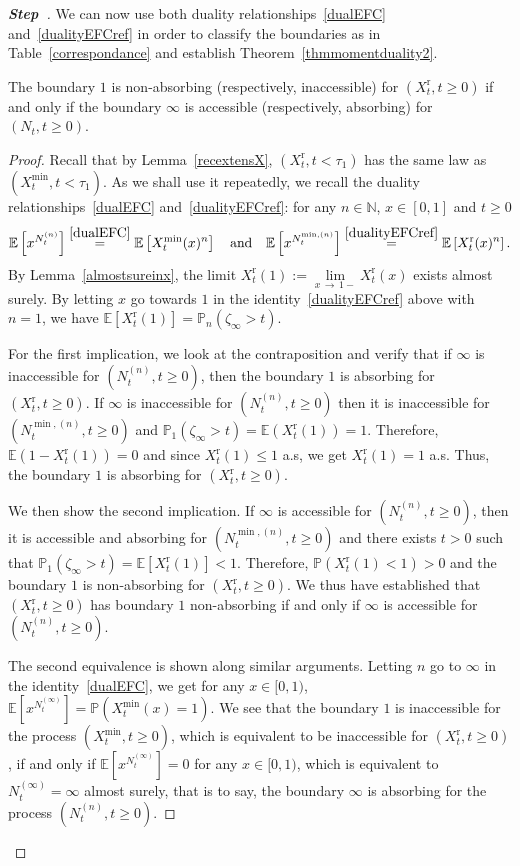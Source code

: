\documentclass[AHL,Unicode,longabstracts,published]{cedram}
\newcommand{\rmr}{\mathrm{r}}
\newcommand{\bbN}{\mathbb{N}}
\newcommand{\bbE}{\mathbb{E}}
\newcommand{\bbP}{\mathbb{P}}
\newcounter{stepcount}
\newenvironment{step}{\refstepcounter{stepcount}\begin{proof}[\textbf{Step~\thestepcount}]}{\end{proof}}
\begin{document}
\begin{step}
We can now use both duality relationships~\eqref{dualEFC} and~\eqref{dualityEFCref} in order to classify the boundaries as in Table~\ref{correspondance} and establish Theorem~\ref{thmmomentduality2}.

\begin{lemm}\label{correspond}
The boundary $1$ is non-absorbing (respectively, inaccessible) for $(X_t^{\rmr},t\geq 0)$ if and only if the boundary $\infty$ is accessible (respectively, absorbing) for $(N_t,t\geq 0)$.
\end{lemm}
\pagebreak
\begin{proof}
Recall that by Lemma~\ref{recextensX}, $(X_t^{\rmr},t<\tau_1)$ has the same law as $(X^{\min}_t,t<\tau_1)$. As we shall use it repeatedly, we recall the duality relationships~\eqref{dualEFC} and~\eqref{dualityEFCref}: for any $n\in \bbN$, $x\in [0,1]$ and $t\geq 0$
\[
\bbE\left[x^{N^{(n)}_t}\right]\overset{\eqref{dualEFC}}{=}\bbE\left[X^{\min}_t(x)^n\right] \quad\text{and}\quad\bbE\left[x^{N^{\min,(n)}_t}\right]\overset{\eqref{dualityEFCref}}{=}\bbE\left[X^{\rmr}_t(x)^n\right].
\]
By Lemma~\ref{almostsureinx}, the limit $X^{\rmr}_t(1):=\underset{x\,\rightarrow\,1-}{\lim} X^{\rmr}_t(x)$ exists almost surely. By letting $x$ go towards $1$ in the identity~\eqref{dualityEFCref} above with $n=1$, we have $\bbE[X^{\rmr}_t(1)]=\bbP_n(\zeta_{\infty}>t)$.

For the first implication, we look at the contraposition and verify that if $\infty$ is inaccessible for $(N^{(n)}_t,t\geq 0)$, then the boundary $1$ is absorbing for $(X_t^{\rmr},t\geq 0)$. If $\infty$ is inaccessible for $(N^{(n)}_t,t\geq 0)$ then it is inaccessible for $(N^{\min,(n)}_t,t\geq 0)$ and $\bbP_1(\zeta_{\infty}>t)=\bbE(X^{\rmr}_t(1))=1$. Therefore, $\bbE(1-X^{\rmr}_t(1))=0$ and since $X^{\rmr}_t(1)\leq 1$ a.s, we get $X^{\rmr}_t(1)=1$ a.s. Thus, the boundary $1$ is absorbing for $(X_t^{\rmr},t\geq 0)$.

We then show the second implication. If $\infty$ is accessible for $(N^{(n)}_t,t\geq 0)$, then it is accessible and absorbing for $(N^{\min,(n)}_t,t\geq 0)$ and there exists $t>0$ such that $\bbP_1(\zeta_{\infty}>t)=\bbE[X^{\rmr}_t(1)]<1$. Therefore, $\bbP(X_t^{\rmr}(1)<1)>0$ and the boundary $1$ is non-absorbing for $(X_t^{\rmr},t\geq 0)$. We thus have established that $(X_t^{\rmr},t\geq 0)$ has boundary $1$ non-absorbing if and only if $\infty$ is accessible for $(N_t^{(n)},t\geq 0)$.

The second equivalence is shown along similar arguments. Letting $n$ go to $\infty$ in the identity~\eqref{dualEFC}, we get for any $x\in [0,1)$, $\bbE[x^{N^{(\infty)}_t}]=\bbP(X^{\min}_t(x)=1)$. We see that the boundary $1$ is inaccessible for the process $(X^{\min}_t,t\geq 0)$, which is equivalent to be inaccessible for $(X_t^{\rmr},t\geq 0)$, if and only if $\bbE[x^{N^{(\infty)}_t}]=0$ for any $x\in [0,1)$, which is equivalent to $N^{(\infty)}_t=\infty$ almost surely, that is to say, the boundary $\infty$ is absorbing for the process $(N_t^{(n)},t\geq 0)$.
\end{proof}\let\qed\relax
\end{step}
\end{document}
